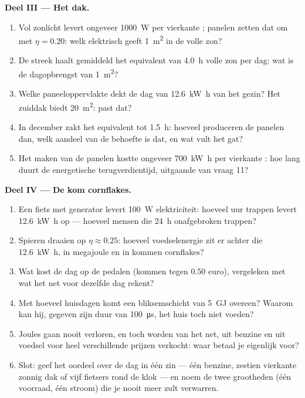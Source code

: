 \begin{problem}
\medskip
\noindent\textbf{Deel III --- Het dak.}
\begin{enumerate}[resume]
  \item Vol zonlicht levert ongeveer \qty{1000}{W} per vierkante ;
        panelen zetten dat om met $\eta = 0.20$: welk elektrisch 
        geeft \qty{1}{m^2} in de volle zon?
  \item De streek haalt gemiddeld het equivalent van \qty{4.0}{h} volle
        zon per dag: wat is de dagopbrengst van \qty{1}{m^2}?
  \item Welke paneeloppervlakte dekt de dag van \qty{12.6}{kW.h} van het
        gezin? Het zuiddak biedt \qty{20}{m^2}: past dat?
  \item In december zakt het equivalent tot \qty{1.5}{h}: hoeveel
        produceren de panelen dan, welk aandeel van de behoefte is dat,
        en wat vult het gat?
  \item Het maken van de panelen kostte ongeveer \qty{700}{kW.h} per
        vierkante : hoe lang duurt de energetische terugverdientijd,
        uitgaande van vraag 11?
\end{enumerate}

\medskip
\noindent\textbf{Deel IV --- De kom cornflakes.}
\begin{enumerate}[resume]
  \item Een fiets met generator levert \qty{100}{W} elektriciteit:
        hoeveel uur trappen levert \qty{12.6}{kW.h} op --- hoeveel
        mensen die \qty{24}{h} onafgebroken trappen?
  \item Spieren draaien op $\eta \approx 0.25$: hoeveel voedselenergie
        zit er achter die \qty{12.6}{kW.h}, in megajoule en in kommen
        cornflakes?
  \item Wat kost de dag op de pedalen (kommen tegen $0.50$ euro),
        vergeleken met wat het net voor dezelfde dag rekent?
  \item Met hoeveel huisdagen komt een bliksemschicht van \qty{5}{GJ}
        overeen? Waarom kan hij, gegeven zijn duur van
        \qty{100}{\micro s}, het huis toch niet voeden?
  \item Joules gaan nooit verloren, en toch worden  van het net,
        uit benzine en uit voedsel voor heel verschillende prijzen
        verkocht: waar betaal je eigenlijk voor?
  \item Slot: geef het oordeel over de dag in één zin --- één 
        benzine, zestien vierkante  zonnig dak of vijf fietsers rond
        de klok --- en noem de twee grootheden (één voorraad, één stroom)
        die je nooit meer zult verwarren.
\end{enumerate}
\end{problem}
